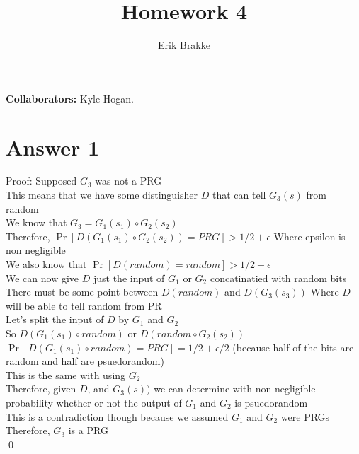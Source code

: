 \documentclass[11pt]{article}
\providecommand{\myparab}[1]{\smallskip\noindent\textbf{#1} }
\theoremstyle{definition}
\begin{document}
\title{Homework 4}
\author{Erik Brakke}
\maketitle

\thispagestyle{fancy}

\myparab{Collaborators: }  Kyle Hogan.
 
 
\section*{Answer 1}

Proof: Supposed $G_3$ was not a PRG\\
This means that we have some distinguisher $D$ that can tell $G_3(s)$ from random\\
We know that $G_3 = G_1(s_1) \circ G_2(s_2)$\\
Therefore, $\Pr[D(G_1(s_1) \circ G_2(s_2)) = PRG] > 1/2 + \epsilon$ Where epsilon is non negligible\\
We also know that $\Pr[D(random) = random] > 1/2 + \epsilon$\\
We can now give $D$ just the input of $G_1$ or $G_2$ concatinatied with random bits\\
There must be some point between $D(random)$ and $D(G_3(s_3))$ Where $D$ will be able to tell random from PR\\
Let's split the input of $D$ by $G_1$ and $G_2$\\
So $D(G_1(s_1) \circ random)$ or $D(random \circ G_2(s_2))$\\
$\Pr[D(G_1(s_1) \circ random) = PRG] = 1/2 + \epsilon/2$ (because half of the bits are random and half are psuedorandom)\\
This is the same with using $G_2$\\
Therefore, given $D$, and $G_3(s))$ we can determine with non-negligible probability whether or not the output of $G_1$ and $G_2$ is psuedorandom\\
This is a contradiction though because we assumed $G_1$ and $G_2$ were PRGs\\
Therefore, $G_3$ is a PRG\\
\qed
\end{document}

